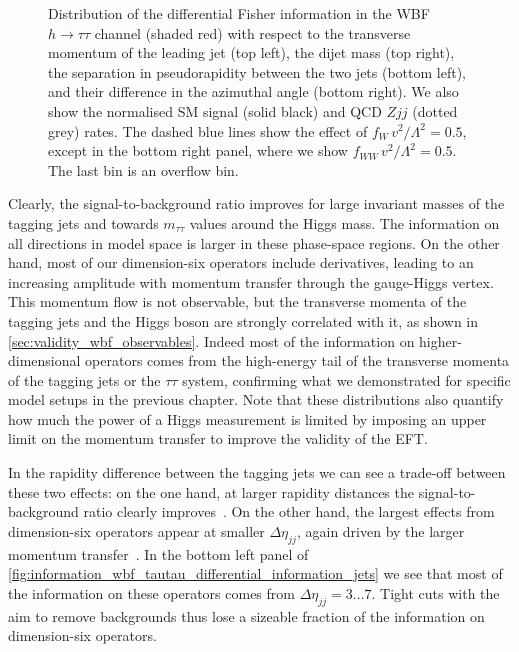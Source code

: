\begin{figure}
  \caption{Distribution of the differential Fisher information in the
    WBF $h \to \tau \tau$ channel (shaded red) with respect to the
    transverse momentum of the leading jet (top left), the dijet mass
    (top right), the separation in pseudorapidity between the two jets
    (bottom left), and their difference in the azimuthal angle (bottom
    right). We also show the normalised SM signal (solid black) and
    QCD $Zjj$ (dotted grey) rates. The dashed blue lines show the effect of
    $f_{W} \, v^2 / \Lambda^2 = 0.5$, except in the bottom right
    panel, where we show $f_{WW} \, v^2 / \Lambda^2 = 0.5$. The last
    bin is an overflow bin.}
  \label{fig:information_wbf_tautau_differential_information_jets}
\end{figure}

Clearly, the signal-to-background ratio improves for large invariant
masses of the tagging jets and towards $m_{\tau \tau}$ values around
the Higgs mass. The information on all directions in model space is
larger in these phase-space regions. On the other hand, most of our
dimension-six operators include derivatives, leading to an increasing
amplitude with momentum transfer through the gauge-Higgs vertex. This
momentum flow is not observable, but the transverse momenta of the
tagging jets and the Higgs boson are strongly correlated with it, as
shown in \autoref{sec:validity_wbf_observables}. Indeed most of the
information on higher-dimensional operators comes from the high-energy
tail of the transverse momenta of the tagging jets or the $\tau \tau$
system, confirming what we demonstrated for specific model setups in
the previous chapter. Note that these distributions also quantify how
much the power of a Higgs measurement is limited by imposing an upper
limit on the momentum transfer to improve the validity of the EFT.

In the rapidity difference between the tagging jets we can see a
trade-off between these two effects: on the one hand, at larger
rapidity distances the signal-to-background ratio clearly
improves~\cite{Kleiss:1987cj, Baur:1990xe, Barger:1991ib,
  Rainwater:1996ud, Rainwater:1998kj, Cox:2010ug, Gerwick:2011tm}. On
the other hand, the largest effects from dimension-six operators appear
at smaller $\Delta \eta_{jj}$, again driven by the larger momentum
transfer~\cite{Biekotter:2016ecg}. In the bottom left panel of
\autoref{fig:information_wbf_tautau_differential_information_jets} we
see that most of the information on these operators comes from
$\Delta \eta_{jj} = 3\dots7$. Tight cuts with the aim to remove
backgrounds thus lose a sizeable fraction of the information on
dimension-six operators.


